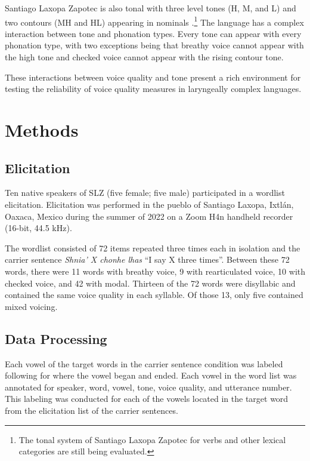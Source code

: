 Santiago Laxopa Zapotec is also tonal with three level tones (H, M, and L) and two contours (MH and HL) appearing in nominals \citep{brinkerhoffTonalPatternsTheir2022}.\footnote{The tonal system of Santiago Laxopa Zapotec for verbs and other lexical categories are still being evaluated.} The language has a complex interaction between tone and phonation types. Every tone can appear with every phonation type, with two exceptions being that breathy voice cannot appear with the high tone and checked voice cannot appear with the rising contour tone.

These interactions between voice quality and tone present a rich environment for testing the reliability of voice quality measures in laryngeally complex languages.

\section{Methods} \label{sec:Methods}
\subsection{Elicitation} \label{sec:Elicitation}

Ten native speakers of SLZ (five female; five male) participated in a wordlist elicitation. Elicitation was performed in the pueblo of Santiago Laxopa, Ixtlán, Oaxaca, Mexico during the summer of 2022 on a Zoom H4n handheld recorder (16-bit, 44.5 kHz). 

The wordlist consisted of 72 items repeated three times each in isolation and the carrier sentence \textit{Shnia' X chonhe lhas} ``I say X three times''. Between these 72 words, there were 11 words with breathy voice, 9 with rearticulated voice, 10 with checked voice, and 42 with modal. Thirteen of the 72 words were disyllabic and contained the same voice quality in each syllable. Of those 13, only five contained mixed voicing.

\subsection{Data Processing} \label{sec:DataProcessing}

Each vowel of the target words in the carrier sentence condition was labeled following \citet{garellekAcousticDiscriminabilityComplex2020} for where the vowel began and ended. Each vowel in the word list was annotated for speaker, word, vowel, tone, voice quality, and utterance number. This labeling was conducted for each of the vowels located in the target word from the elicitation list of the carrier sentences.

